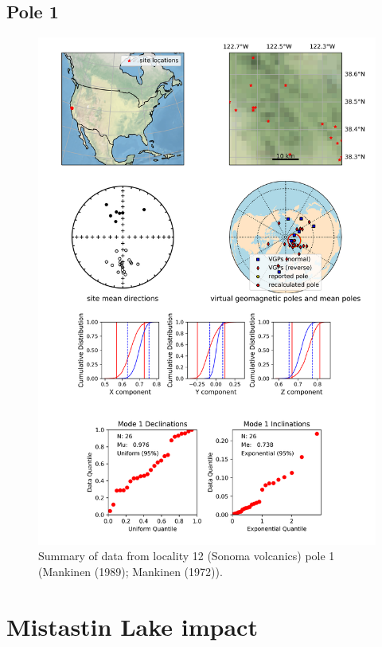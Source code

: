 \subsection{Pole 1}


\begin{figure}[H]
\centering
\includegraphics[width=5 in]{./12/1/pole_summary.png}
\caption{Summary of data from locality 12 (Sonoma volcanics) pole 1 (Mankinen (1989); Mankinen (1972)).}
\end{figure}

\section{Mistastin Lake impact}

